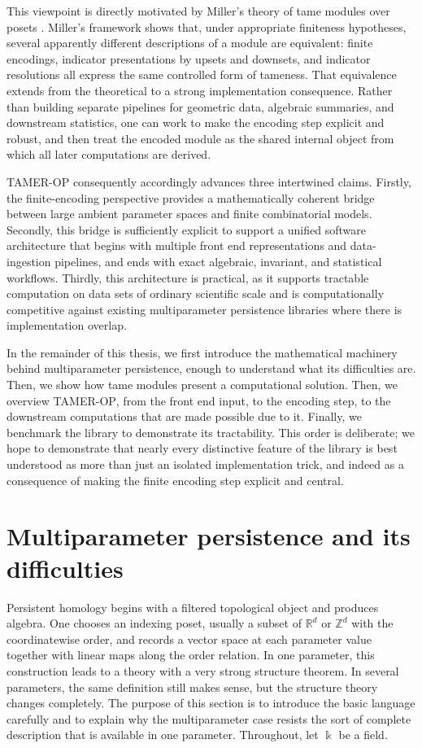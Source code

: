 \documentclass[11pt]{article}
\newcommand{\R}{\mathbb{R}}
\newcommand{\Z}{\mathbb{Z}}
\newcommand{\kk}{\Bbbk}
\newcommand{\TAMER}{\textsc{TAMER-OP}}
\theoremstyle{definition}
\theoremstyle{remark}
\begin{document}
This viewpoint is directly motivated by Miller's theory of tame modules over posets \cite{Mil20}. Miller's framework shows that, under appropriate finiteness hypotheses, several apparently different descriptions of a module are equivalent: finite encodings, indicator presentations by upsets and downsets, and indicator resolutions all express the same controlled form of tameness. That equivalence extends from the theoretical to a strong implementation consequence. Rather than building separate pipelines for geometric data, algebraic summaries, and downstream statistics, one can work to make the encoding step explicit and robust, and then treat the encoded module as the shared internal object from which all later computations are derived.

\TAMER{} consequently accordingly advances three intertwined claims. Firstly, the finite-encoding perspective provides a mathematically coherent bridge between large ambient parameter spaces and finite combinatorial models. Secondly, this bridge is sufficiently explicit to support a unified software architecture that begins with multiple front end representations and data-ingestion pipelines, and ends with exact algebraic, invariant, and statistical workflows. Thirdly, this architecture is practical, as it supports tractable computation on data sets of ordinary scientific scale and is computationally competitive against existing multiparameter persistence libraries where there is implementation overlap.

In the remainder of this thesis, we first introduce the mathematical machinery behind multiparameter persistence, enough to understand what its difficulties are. Then, we show how tame modules present a computational solution. Then, we overview \TAMER{}, from the front end input, to the encoding step, to the downstream computations that are made possible due to it. Finally, we benchmark the library to demonstrate its tractability. This order is deliberate; we hope to demonstrate that nearly every distinctive feature of the library is best understood as more than just an isolated implementation trick, and indeed as a consequence of making the finite encoding step explicit and central.



\section{Multiparameter persistence and its difficulties}\label{sec:background}

Persistent homology begins with a filtered topological object and produces algebra. One chooses an indexing poset, usually a subset of $\R^d$ or $\Z^d$ with the coordinatewise order, and records a vector space at each parameter value together with linear maps along the order relation. In one parameter, this construction leads to a theory with a very strong structure theorem. In several parameters, the same definition still makes sense, but the structure theory changes completely. The purpose of this section is to introduce the basic language carefully and to explain why the multiparameter case resists the sort of complete description that is available in one parameter. Throughout, let $\kk$ be a field.
\end{document}
